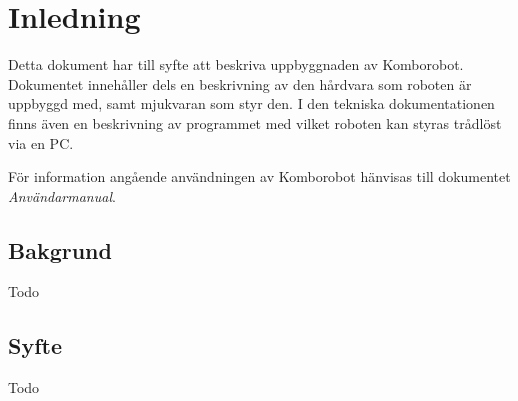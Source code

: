 
%
%


\section{Inledning}
Detta dokument har till syfte att beskriva uppbyggnaden av Komborobot.
Dokumentet innehåller dels en beskrivning av den hårdvara som roboten är 
uppbyggd med, samt mjukvaran som styr den. I den tekniska dokumentationen 
finns även en beskrivning av programmet med vilket roboten kan styras trådlöst 
via en PC. 

För information angående användningen av Komborobot hänvisas till dokumentet \emph{Användarmanual}. 

\subsection{Bakgrund}
Todo
\subsection{Syfte}
Todo
